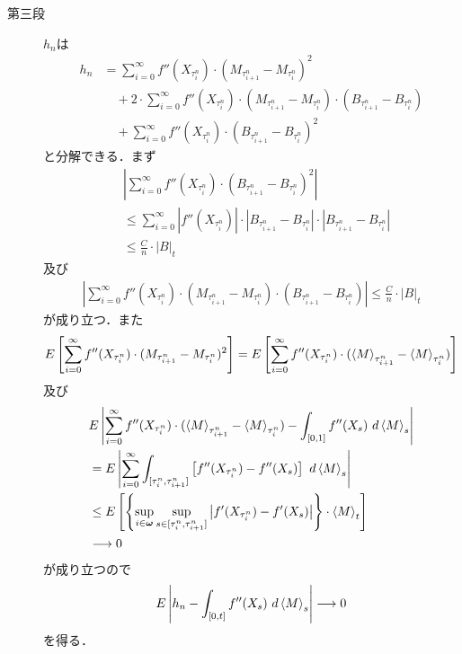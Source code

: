 \begin{sketch}
\begin{description}
			\item[第三段]
				$h_{n}$は
				\begin{align}
					h_{n} &= \sum_{i=0}^{\infty} f''(X_{\tau^{n}_{i}}) \cdot (M_{\tau^{n}_{i+1}} - M_{\tau^{n}_{i}})^{2} \\
					&\quad + 2 \cdot \sum_{i=0}^{\infty} f''(X_{\tau^{n}_{i}}) \cdot (M_{\tau^{n}_{i+1}} - M_{\tau^{n}_{i}}) \cdot (B_{\tau^{n}_{i+1}} - B_{\tau^{n}_{i}}) \\
					&\quad + \sum_{i=0}^{\infty} f''(X_{\tau^{n}_{i}}) \cdot (B_{\tau^{n}_{i+1}} - B_{\tau^{n}_{i}})^{2}
				\end{align}
				と分解できる．まず
				\begin{align}
					&\left| \sum_{i=0}^{\infty} f''(X_{\tau^{n}_{i}}) \cdot (B_{\tau^{n}_{i+1}} - B_{\tau^{n}_{i}})^{2} \right| \\
					&\leq \sum_{i=0}^{\infty} \left|f''(X_{\tau^{n}_{i}})\right| \cdot \left|B_{\tau^{n}_{i+1}} - B_{\tau^{n}_{i}}\right| \cdot \left|B_{\tau^{n}_{i+1}} - B_{\tau^{n}_{i}}\right| \\
					&\leq \frac{C}{n} \cdot |B|_{t}
				\end{align}
				及び
				\begin{align}
					\left| \sum_{i=0}^{\infty} f''(X_{\tau^{n}_{i}}) \cdot (M_{\tau^{n}_{i+1}} - M_{\tau^{n}_{i}}) \cdot (B_{\tau^{n}_{i+1}} - B_{\tau^{n}_{i}}) \right|
					\leq \frac{C}{n} \cdot |B|_{t}
				\end{align}
				が成り立つ．また
				\begin{align}
					E\left[\sum_{i=0}^{\infty} f''(X_{\tau^{n}_{i}}) \cdot (M_{\tau^{n}_{i+1}} - M_{\tau^{n}_{i}})^{2}\right]
					= E\left[\sum_{i=0}^{\infty} f''(X_{\tau^{n}_{i}}) \cdot (\inprod<M>_{\tau^{n}_{i+1}} - \inprod<M>_{\tau^{n}_{i}})\right]
					\label{fom:Ito_formula_2}
				\end{align}
				及び
				\begin{align}
					&E\left|\sum_{i=0}^{\infty} f''(X_{\tau^{n}_{i}}) \cdot (\inprod<M>_{\tau^{n}_{i+1}} - \inprod<M>_{\tau^{n}_{i}})
					- \int_{[0,1]} f''(X_{s})\ d\inprod<M>_{s}\right| \\
					&= E\left|\sum_{i=0}^{\infty} \int_{[\tau^{n}_{i},\tau^{n}_{i+1}]} \left[ f''(X_{\tau^{n}_{i}}) - f''(X_{s}) \right]\ d\inprod<M>_{s}\right| \\
					&\leq E\left[\left\{\sup{i \in \Natural}{\sup{s \in [\tau^{n}_{i},\tau^{n}_{i+1}]}{
					\left|f'(X_{\tau^{n}_{i}}) - f'(X_{s}) \right|}}\right\} \cdot \inprod<M>_{t}\right] \\
					&\longrightarrow 0
				\end{align}
				が成り立つので
				\begin{align}
					E\left|h_{n} - \int_{[0,t]} f''(X_{s})\ d\inprod<M>_{s}\right|
					\longrightarrow 0
				\end{align}
				を得る．
				

\end{description}
\end{sketch}
